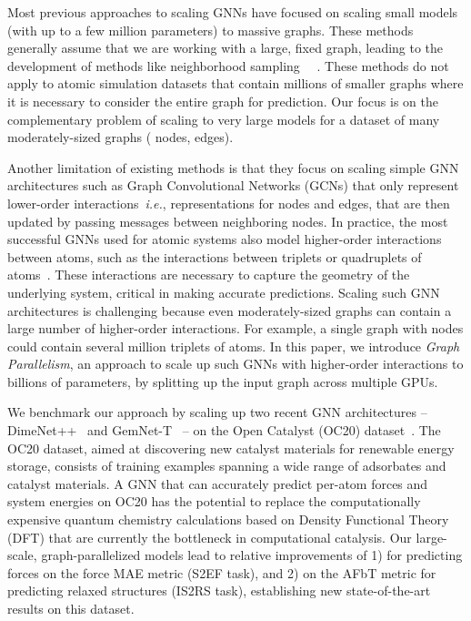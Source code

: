 \documentclass{article} \usepackage{iclr2022_conference,times}
\begin{document}
Most previous approaches to scaling GNNs have focused on scaling small models (with up to a few million parameters) to massive graphs. These methods generally assume that we are working with a large, fixed graph, leading to the development of methods like neighborhood sampling~\citep{jangda2021accelerating,zheng2021distdgl}
~\citep{Jia2020ImprovingTA,Ma2019NeuGraphPD,tripathy2020reducing}.
These methods do not apply to atomic simulation datasets that contain millions of smaller graphs
where it is necessary to consider the entire graph for prediction. Our focus is on the complementary problem of scaling to very large models for a dataset of many moderately-sized graphs ( nodes,  edges).

Another limitation of existing methods is that they focus on scaling simple GNN architectures such as Graph Convolutional Networks (GCNs) that only represent lower-order interactions~\textit{i.e.}, representations for nodes and edges, that are then updated by passing messages between neighboring nodes.
In practice, the most successful GNNs used for atomic systems also model higher-order interactions between atoms, such as the interactions between triplets or quadruplets of atoms~\citep{klicpera_dimenetpp_2020,klicpera2021gemnet,liu2021spherical}.
These interactions are necessary to capture the geometry of the underlying system,
critical in making accurate predictions. Scaling such GNN architectures is challenging because even moderately-sized graphs can contain a large number of higher-order interactions. For example, a single graph with  nodes could contain several million triplets of atoms.
In this paper, we introduce \emph{Graph Parallelism}, an approach to scale up
such GNNs with higher-order interactions to billions of parameters,
by splitting up the input graph across multiple GPUs.


We benchmark our approach by scaling up two recent GNN architectures -- DimeNet++~\citep{klicpera_dimenetpp_2020} and GemNet-T~\citep{klicpera2021gemnet} -- on the Open Catalyst (OC20) dataset~\citep{OC20}.
The OC20 dataset, aimed at discovering new catalyst materials for renewable energy storage,
consists of  training examples spanning a wide range of adsorbates and catalyst materials.
A GNN that can accurately predict per-atom forces and system energies on OC20
has the potential to replace the computationally expensive quantum chemistry calculations based on Density Functional Theory (DFT) that are currently the bottleneck in computational catalysis. Our large-scale, graph-parallelized models lead to relative improvements of
1)  for predicting forces on the force MAE metric (S2EF task), and 2)  on the AFbT metric for predicting relaxed structures (IS2RS task), establishing new state-of-the-art results on this dataset.
\end{document}
